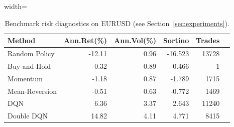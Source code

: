 \begin{table}[!tbp]
\centering
\caption{Benchmark risk diagnostics on EURUSD (see Section~\ref{sec:experiments}).}
\label{tab:benchmark_risk}
\begin{adjustbox}{width=\linewidth}
\begin{tabular}{@{}lrrrrr@{}}
\toprule
\textbf{Method} & \textbf{Ann.Ret(\%)} & \textbf{Ann.Vol(\%)} & \textbf{Sortino} & \textbf{Trades} \\
\midrule
Random Policy & -12.11 & 0.96 & -16.523 & 13728 \\
Buy-and-Hold & -0.32 & 0.89 & -0.466 & 1 \\
Momentum & -1.18 & 0.87 & -1.789 & 1715 \\
Mean-Reversion & -0.51 & 0.63 & -0.772 & 1469 \\
DQN & 6.36 & 3.37 & 2.643 & 11240 \\
Double DQN & 14.82 & 4.11 & 4.771 & 8415 \\
\bottomrule
\end{tabular}
\end{adjustbox}
\end{table}


